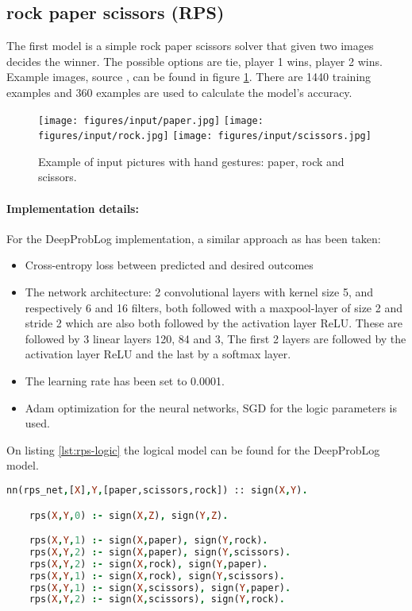 \subsection{rock paper scissors (RPS)}
The first model is a simple rock paper scissors solver that given two images decides the winner. The possible options are tie, player 1 wins, player 2 wins. Example images, source \cite{RPSLS-database}, can be found in figure \ref{fig:rps_input}. There are 1440 training examples and 360 examples are used to calculate the model's accuracy. 

\begin{figure}[htp]
    \centering
    \texttt{[image: figures/input/paper.jpg]}\hfill
    \texttt{[image: figures/input/rock.jpg]}\hfill
    \texttt{[image: figures/input/scissors.jpg]}
    \caption{Example of input pictures with hand gestures: paper, rock and scissors\cite{RPSLS-database}.} %
    \label{fig:rps_input}
\end{figure}

\paragraph{Implementation details:} For the DeepProbLog implementation, a similar approach as \cite{DBLP} has been taken:
\begin{itemize}
    \item Cross-entropy loss between predicted and desired outcomes
    \item The network architecture: 2 convolutional layers with kernel size 5, and respectively 6 and 16 filters, both followed with a maxpool-layer of size 2 and stride 2 which are also both followed by the activation layer ReLU. These are followed by 3 linear layers 120, 84 and 3, The first 2 layers are followed by the activation layer ReLU and the last by a softmax layer. \item The learning rate has been set to 0.0001. 
    \item Adam \cite{kingma2014adam} optimization for the neural networks, SGD for the logic parameters is used.
  \end{itemize}
  On listing \ref{lst:rps-logic} the logical model can be found for the DeepProbLog model.

  \begin{lstlisting}[label={lst:rps-logic},language=Prolog,frame=single,caption={Rock paper scissors DeepProbLog model},captionpos=b]
    nn(rps_net,[X],Y,[paper,scissors,rock]) :: sign(X,Y).

    rps(X,Y,0) :- sign(X,Z), sign(Y,Z).

    rps(X,Y,1) :- sign(X,paper), sign(Y,rock).
    rps(X,Y,2) :- sign(X,paper), sign(Y,scissors).
    rps(X,Y,2) :- sign(X,rock), sign(Y,paper).
    rps(X,Y,1) :- sign(X,rock), sign(Y,scissors).
    rps(X,Y,1) :- sign(X,scissors), sign(Y,paper).
    rps(X,Y,2) :- sign(X,scissors), sign(Y,rock).
    \end{lstlisting}

